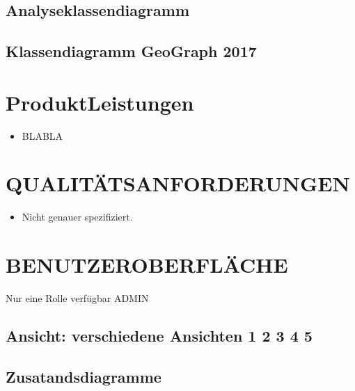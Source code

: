 	\subsection{Analyseklassendiagramm}
	\subsection{Klassendiagramm GeoGraph 2017}
	
	
	\section{\Large ProduktLeistungen}
	\begin{itemize}
		\item BLABLA
	\end{itemize}	
	
	
	\section{\Large QUALITÄTSANFORDERUNGEN}
	\begin{itemize}
		\item Nicht genauer spezifiziert.
	\end{itemize}
	
	\section{\Large BENUTZEROBERFLÄCHE}
	Nur eine Rolle verfügbar ADMIN
	\subsection{Ansicht: verschiedene Ansichten 1 2 3 4 5}
	\subsection{Zusatandsdiagramme}
	
	
